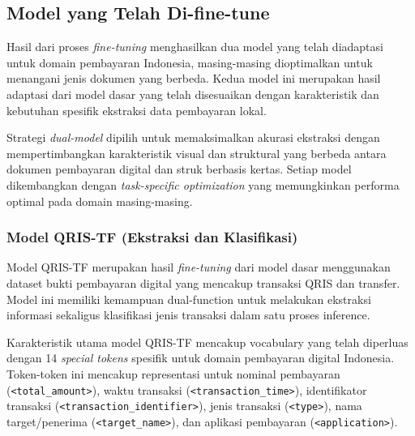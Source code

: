 \subsection{Model yang Telah Di-fine-tune}
\label{subsec:model-fine-tuned}

Hasil dari proses \emph{fine-tuning} menghasilkan dua model yang telah diadaptasi untuk domain pembayaran Indonesia, masing-masing dioptimalkan untuk menangani jenis dokumen yang berbeda. Kedua model ini merupakan hasil adaptasi dari model \donut{} dasar yang telah disesuaikan dengan karakteristik dan kebutuhan spesifik ekstraksi data pembayaran lokal.


Strategi \emph{dual-model} dipilih untuk memaksimalkan akurasi ekstraksi dengan mempertimbangkan karakteristik visual dan struktural yang berbeda antara dokumen pembayaran digital dan struk berbasis kertas. Setiap model dikembangkan dengan \emph{task-specific optimization} yang memungkinkan performa optimal pada domain masing-masing.

\subsubsection{Model QRIS-TF (Ekstraksi dan Klasifikasi)}
\label{subsubsec:model-qris-tf}

Model QRIS-TF merupakan hasil \emph{fine-tuning} dari model \donut{} dasar menggunakan dataset bukti pembayaran digital yang mencakup transaksi QRIS dan transfer. Model ini memiliki kemampuan dual-function untuk melakukan ekstraksi informasi sekaligus klasifikasi jenis transaksi dalam satu proses inference.


Karakteristik utama model QRIS-TF mencakup vocabulary yang telah diperluas dengan 14 \emph{special tokens} spesifik untuk domain pembayaran digital Indonesia. Token-token ini mencakup representasi untuk nominal pembayaran (\texttt{<total\_amount>}), waktu transaksi (\texttt{<transaction\_time>}), identifikator transaksi (\texttt{<transaction\_identifier>}), jenis transaksi (\texttt{<type>}), nama target/penerima (\texttt{<target\_name>}), dan aplikasi pembayaran (\texttt{<application>}).

